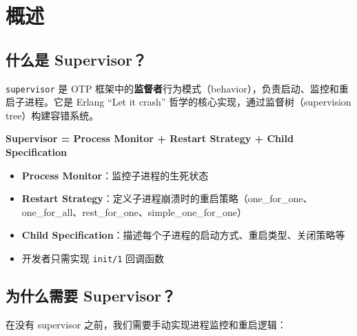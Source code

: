 \documentclass[a4paper,11pt]{article}
\begin{document}
\newpage
\tableofcontents
\newpage


\section{概述}

\subsection{什么是 Supervisor？}

\texttt{supervisor} 是 OTP 框架中的\textbf{监督者}行为模式（behavior），负责启动、监控和重启子进程。它是 Erlang ``Let it crash'' 哲学的核心实现，通过监督树（supervision tree）构建容错系统。

\begin{tipbox}[核心思想]
\textbf{Supervisor = Process Monitor + Restart Strategy + Child Specification}

\begin{itemize}[leftmargin=1.5em]
    \item \textbf{Process Monitor}：监控子进程的生死状态
    \item \textbf{Restart Strategy}：定义子进程崩溃时的重启策略（one\_for\_one、one\_for\_all、rest\_for\_one、simple\_one\_for\_one）
    \item \textbf{Child Specification}：描述每个子进程的启动方式、重启类型、关闭策略等
    \item 开发者只需实现 \texttt{init/1} 回调函数
\end{itemize}
\end{tipbox}

\subsection{为什么需要 Supervisor？}

在没有 supervisor 之前，我们需要手动实现进程监控和重启逻辑：
\end{document}
